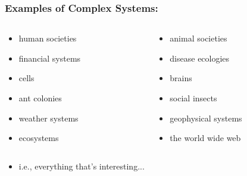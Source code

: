 \begin{frame}
  \frametitle{Examples of Complex Systems:}

  \begin{block}{}
    \begin{columns}[t] 
      \begin{column}{0.45\textwidth} 
        \begin{itemize}
        \item human societies 
        \item financial systems
        \item cells     
        \item ant colonies 
        \item weather systems 
        \item ecosystems     
        \end{itemize}
      \end{column} 
      \begin{column}{0.45\textwidth} 
        \begin{itemize}
        \item animal societies     
        \item disease ecologies    
        \item brains               
        \item social insects       
        \item geophysical systems  
        \item the world wide web   
        \end{itemize}
      \end{column} 
    \end{columns} 
  \end{block}

  \begin{itemize}
  \item<+->
    i.e., everything that's interesting...
  \end{itemize}


\end{frame}

